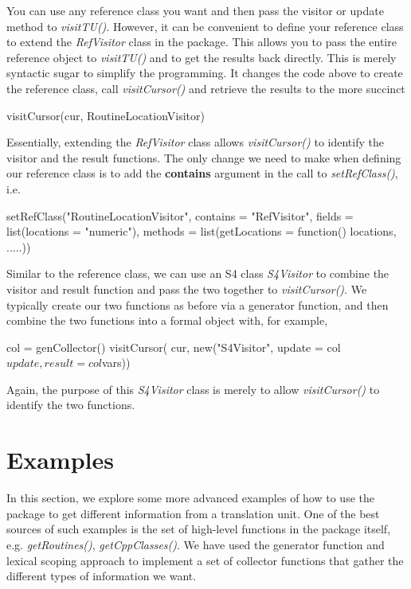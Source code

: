 \documentclass[article]{jss}
\def\Rpkg#1{\pkg{#1}}
\def\Rfunc#1{\textsl{#1()}}
\def\Rclass#1{\textit{#1}}
\def\Rarg#1{\textbf{#1}}
\begin{document}
You can use any reference class you want and then pass the visitor or
update method to \Rfunc{visitTU}.  However, it can be convenient to
define your reference class to extend the \Rclass{RefVisitor} class in
the \Rpkg{RCIndex} package. This allows you to pass the entire
reference object to \Rfunc{visitTU} and to get the results back
directly. This is merely syntactic sugar to simplify the
programming. It changes the code above to create the reference class,
call \Rfunc{visitCursor} and retrieve the results to the more succinct
\begin{RCode}
visitCursor(cur, RoutineLocationVisitor)
\end{RCode}
Essentially, extending the \Rclass{RefVisitor} class allows
\Rfunc{visitCursor} to identify the visitor and the result functions.
The only change we need to make when defining our reference class
is to add the \Rarg{contains} argument in the call to
\Rfunc{setRefClass}, i.e.
\begin{RCode}
setRefClass("RoutineLocationVisitor",
            contains = "RefVisitor",
            fields = list(locations = "numeric"),
            methods = list(getLocations = function() locations,
                       .....))
\end{RCode}



Similar to the reference class, we can use an S4 class
\Rclass{S4Visitor} to combine the visitor and result function
and pass the two together to \Rfunc{visitCursor}.
We typically create our two functions as before
via a generator function, and then combine the two 
functions into a formal object with, for example,
\begin{RCode}
col = genCollector()
visitCursor( cur, new("S4Visitor",  update = col$update, result = col$vars))
\end{RCode}
Again, the purpose of this \Rclass{S4Visitor} class is merely to 
allow \Rfunc{visitCursor} to identify the two functions.





\section{Examples}
In this section, we explore some more advanced examples of how to use
the \Rpkg{RCIndex} package to get different information from a
translation unit.  One of the best sources of such examples is the set
of high-level functions in the package itself,
e.g. \Rfunc{getRoutines}, \Rfunc{getCppClasses}.  We have used the
generator function and lexical scoping approach to implement a set of
collector functions that gather the different types of information we
want.
\end{document}
